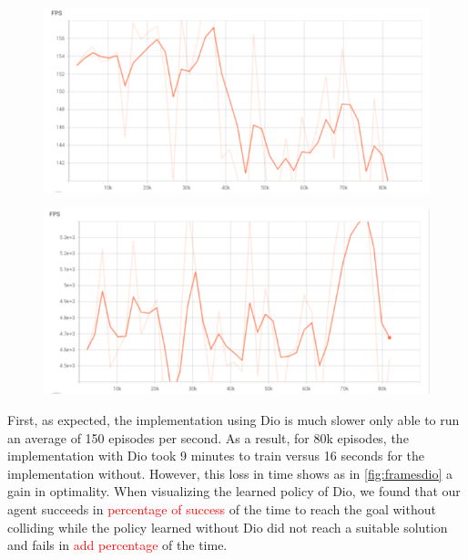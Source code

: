     \begin{figure}[H]
      \centering
      \begin{minipage}{.5\textwidth}
        \centering
        \includegraphics[width=1\linewidth]{figures/diofps.png}
        \label{fig:fpsdio}
      \end{minipage}%
      \begin{minipage}{.5\textwidth}
        \centering
        \includegraphics[width=1\linewidth]{figures/rlfps.png}
        \label{fig:fpsrl}
      \end{minipage}
    \end{figure}

    First, as expected, the implementation using Dio is much slower only able to run 
    an average of 150 episodes per second. As a result, for 80k episodes, the implementation with Dio 
    took 9 minutes to train versus 16 seconds for the implementation without. However, this loss in time shows as in \ref{fig:framesdio} 
    a gain in optimality. When visualizing the learned policy of Dio, we found that our agent succeeds in \textcolor{red}{percentage of success} 
    of the time to reach the goal without colliding while the policy learned without Dio did not reach a suitable solution and fails in \textcolor{red}{add percentage} 
    of the time. 

